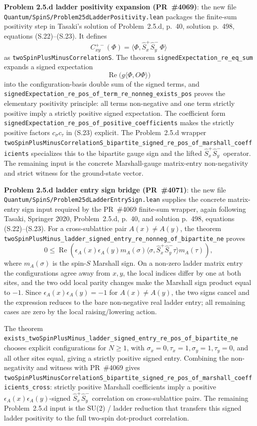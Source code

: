 \documentclass[a4paper,11pt]{article}
\begin{document}
\textbf{Problem 2.5.d ladder positivity expansion (PR~\#4069)}:
the new file \texttt{Quantum/SpinS/Problem25dLadderPositivity.lean}
packages the finite-sum positivity step in Tasaki's solution of
Problem~2.5.d, p.~40, solution p.~498, equations (S.22)--(S.23).  It defines
\[
  C^{+-}_{xy}(\Phi)=
  \langle\Phi,\hat S_x^+\hat S_y^-\,\Phi\rangle
\]
as \texttt{twoSpinPlusMinusCorrelationS}.  The theorem
\texttt{signedExpectation\_re\_eq\_sum} expands a signed expectation
\[
  \operatorname{Re}\bigl(g\langle \Phi,O\Phi\rangle\bigr)
\]
into the configuration-basis double sum of the signed terms, and
\texttt{signedExpectation\_re\_pos\_of\_term\_re\_nonneg\_exists\_pos}
proves the elementary positivity principle: all terms non-negative and one
term strictly positive imply a strictly positive signed expectation.  The
coefficient form
\texttt{signedExpectation\_re\_pos\_of\_positive\_coefficients} makes the
strictly positive factors \(c_\sigma c_\tau\) in (S.23) explicit.  The
Problem~2.5.d wrapper
\texttt{twoSpinPlusMinusCorrelationS\_bipartite\_signed\_re\_pos\_of\_marshall\_coefficients}
specializes this to the bipartite gauge sign and the lifted
\(\hat S_x^+\hat S_y^-\) operator.  The remaining input is the concrete
Marshall-gauge matrix-entry non-negativity and strict witness for the
ground-state vector.

\textbf{Problem 2.5.d ladder entry sign bridge (PR~\#4071)}:
the new file \texttt{Quantum/SpinS/Problem25dLadderEntrySign.lean}
supplies the concrete matrix-entry sign input required by the PR~\#4069
finite-sum wrapper, again following Tasaki, Springer 2020,
Problem~2.5.d, p.~40, and solution p.~498, equations (S.22)--(S.23).
For a cross-sublattice pair \(A(x)\ne A(y)\), the theorem
\texttt{twoSpinPlusMinus\_ladder\_signed\_entry\_re\_nonneg\_of\_bipartite\_ne}
proves
\[
  0\le
  \operatorname{Re}\!\left(
    \epsilon_A(x)\epsilon_A(y)
    m_A(\sigma)
    \langle\sigma,\hat S_x^+\hat S_y^- \tau\rangle
    m_A(\tau)
  \right),
\]
where \(m_A(\sigma)\) is the spin-\(S\) Marshall sign.  On a non-zero
ladder matrix entry the configurations agree away from \(x,y\), the local
indices differ by one at both sites, and the two odd local parity changes
make the Marshall sign product equal to \(-1\).  Since
\(\epsilon_A(x)\epsilon_A(y)=-1\) for \(A(x)\ne A(y)\), the two signs
cancel and the expression reduces to the bare non-negative real ladder
entry; all remaining cases are zero by the local raising/lowering action.

The theorem
\texttt{exists\_twoSpinPlusMinus\_ladder\_signed\_entry\_re\_pos\_of\_bipartite\_ne}
chooses explicit configurations for \(N\ge 1\), with
\(\sigma_x=0,\tau_x=1,\sigma_y=1,\tau_y=0\), and all other sites equal,
giving a strictly positive signed entry.  Combining the non-negativity
and witness with PR~\#4069 gives
\texttt{twoSpinPlusMinusCorrelationS\_bipartite\_signed\_re\_pos\_of\_marshall\_coefficients\_cross}:
strictly positive Marshall coefficients imply a positive
\(\epsilon_A(x)\epsilon_A(y)\)-signed \(\hat S_x^+\hat S_y^-\)
correlation on cross-sublattice pairs.  The remaining Problem~2.5.d
input is the SU(2) / ladder reduction that transfers this signed ladder
positivity to the full two-spin dot-product correlation.
\end{document}
